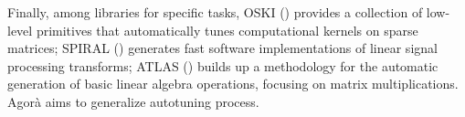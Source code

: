 Finally, among libraries for specific tasks, OSKI (\cite{vuduc2005oski}) provides a collection of low-level primitives that automatically tunes computational kernels on sparse matrices; SPIRAL (\cite{puschel2004spiral}) generates fast software implementations of linear signal processing transforms; ATLAS (\cite{whaley1998automatically}) builds up a methodology for the automatic generation of basic linear algebra operations, focusing on matrix multiplications. Agorà aims to generalize autotuning process.
